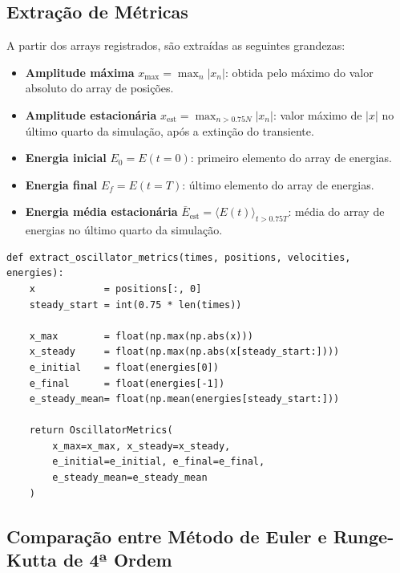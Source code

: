 \subsection{Extração de Métricas}

A partir dos arrays registrados, são extraídas as seguintes grandezas:

\begin{itemize}
    \item \textbf{Amplitude máxima} $x_\text{max} = \max_n |x_n|$: obtida pelo máximo do valor absoluto do array de posições.
    \item \textbf{Amplitude estacionária} $x_\text{est} = \max_{n > 0.75N} |x_n|$: valor máximo de $|x|$ no último quarto da simulação, após a extinção do transiente.
    \item \textbf{Energia inicial} $E_0 = E(t=0)$: primeiro elemento do array de energias.
    \item \textbf{Energia final} $E_f = E(t=T)$: último elemento do array de energias.
    \item \textbf{Energia média estacionária} $\bar{E}_\text{est} = \langle E(t) \rangle_{t > 0.75T}$: média do array de energias no último quarto da simulação.
\end{itemize}

\begin{lstlisting}[caption={Extração de métricas a partir dos arrays simulados}, label={lst:2.metrics}]
def extract_oscillator_metrics(times, positions, velocities, energies):
    x            = positions[:, 0]
    steady_start = int(0.75 * len(times))

    x_max        = float(np.max(np.abs(x)))
    x_steady     = float(np.max(np.abs(x[steady_start:])))
    e_initial    = float(energies[0])
    e_final      = float(energies[-1])
    e_steady_mean= float(np.mean(energies[steady_start:]))

    return OscillatorMetrics(
        x_max=x_max, x_steady=x_steady,
        e_initial=e_initial, e_final=e_final,
        e_steady_mean=e_steady_mean
    )
\end{lstlisting}


\subsection{Comparação entre Método de Euler e Runge-Kutta de 4ª Ordem}
\label{subsec:2.euler-vs-rk4}

